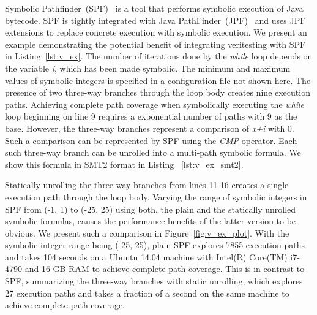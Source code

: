Symbolic Pathfinder~(SPF)~\cite{spf} is a tool that performs symbolic execution of Java bytecode.
%
SPF is tightly integrated with Java PathFinder~(JPF)~\cite{jpf} and uses JPF extensions to replace concrete execution with symbolic execution.
%
We present an example demonstrating the potential benefit of integrating veritesting with SPF in Listing~\ref{lst:v_ex}.
%
The number of iterations done by the \textit{while} loop depends on the variable \textit{i}, which has been made symbolic.
%
The minimum and maximum values of symbolic integers is specified in a configuration file not shown here.
%
The presence of two three-way branches through the loop body creates nine execution paths.
%
Achieving complete path coverage when symbolically executing the \textit{while} loop beginning on line 9 requires a exponential number of paths with 9 as the base.
%
However, the three-way branches represent a comparison of \textit{x+i} with 0.
%
Such a comparison can be represented by SPF using the \textit{CMP} operator.
%
Each such three-way branch can be unrolled into a multi-path symbolic formula.
%
We show this formula in SMT2 format in Listing ~\ref{lst:v_ex_smt2}.
%
%

%
%
%
Statically unrolling the three-way branches from lines 11-16 creates a single execution path through the loop body.
%
Varying the range of symbolic integers in SPF from (-1, 1) to (-25, 25) using both, the plain and the statically unrolled symbolic formulas, causes the performance benefits of the latter version to be obvious.
%
We present such a comparison in Figure~\ref{fig:v_ex_plot}.
%
With the symbolic integer range being (-25, 25), plain SPF explores 7855 execution paths and takes 104 seconds on a Ubuntu 14.04 machine with Intel(R) Core(TM) i7-4790 and 16 GB RAM to achieve complete path coverage.
%
This is in contrast to SPF, summarizing the three-way branches with static unrolling, which explores 27 execution paths and takes a fraction of a second on the same machine to achieve complete path coverage.

